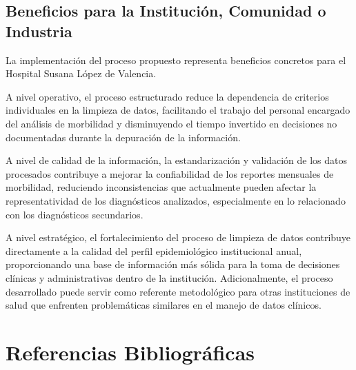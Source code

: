 \documentclass[12pt, letterpaper, oneside]{article}
\begin{document}
\subsection{Beneficios para la Institución, Comunidad o Industria}

La implementación del proceso propuesto representa beneficios concretos para el Hospital Susana López de Valencia.

A nivel operativo, el proceso estructurado reduce la dependencia de criterios individuales en la limpieza de datos, facilitando el trabajo del personal encargado del análisis de morbilidad y disminuyendo el tiempo invertido en decisiones no documentadas durante la depuración de la información.

A nivel de calidad de la información, la estandarización y validación de los datos procesados contribuye a mejorar la confiabilidad de los reportes mensuales de morbilidad, reduciendo inconsistencias que actualmente pueden afectar la representatividad de los diagnósticos analizados, especialmente en lo relacionado con los diagnósticos secundarios.

A nivel estratégico, el fortalecimiento del proceso de limpieza de datos contribuye directamente a la calidad del perfil epidemiológico institucional anual, proporcionando una base de información más sólida para la toma de decisiones clínicas y administrativas dentro de la institución. Adicionalmente, el proceso desarrollado puede servir como referente metodológico para otras instituciones de salud que enfrenten problemáticas similares en el manejo de datos clínicos.




\newpage


\section{Referencias Bibliográficas}
\printbibliography[heading=none]


\end{document}
